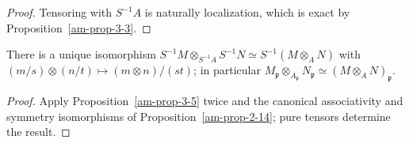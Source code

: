 \begin{proof}
Tensoring with $S^{-1}A$ is naturally localization, which is exact by
Proposition~\ref{am-prop-3-3}.
\end{proof}
\begin{proposition}
\label{am-prop-3-7}
\uses{}
There is a unique isomorphism
$S^{-1}M\otimes_{S^{-1}A}S^{-1}N\simeq S^{-1}(M\otimes_A N)$ with
$(m/s)\otimes(n/t)\mapsto(m\otimes n)/(st)$; in particular
$M_\mathfrak{p}\otimes_{A_\mathfrak{p}}N_\mathfrak{p}\simeq(M\otimes_A N)_\mathfrak{p}$.
\end{proposition}
\begin{proof}
Apply Proposition~\ref{am-prop-3-5} twice and the canonical associativity and
symmetry isomorphisms of Proposition~\ref{am-prop-2-14}; pure tensors determine
the result.
\end{proof}

